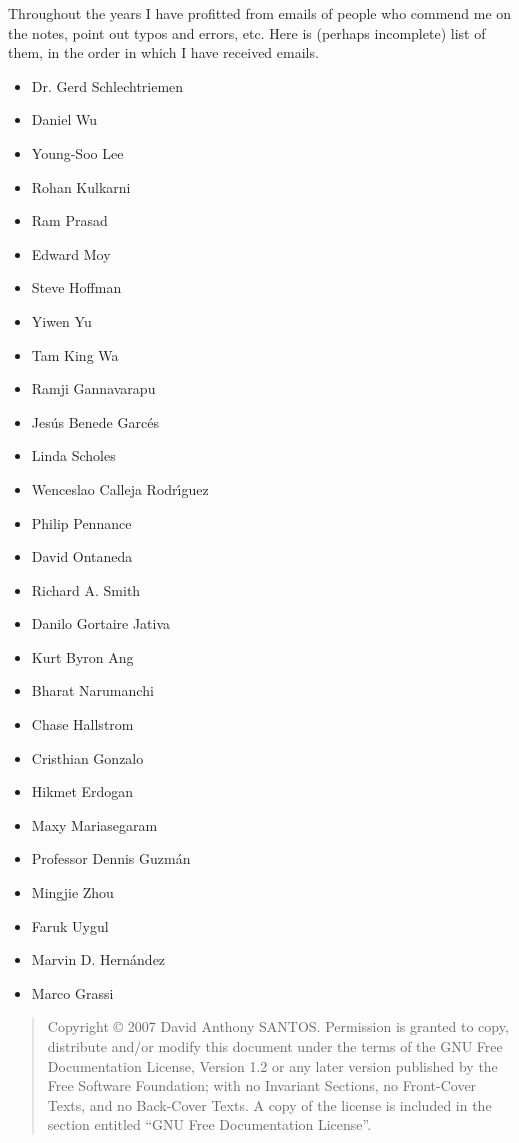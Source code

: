 \documentclass[11pt, openany]{book}
\theoremstyle{change} \theoremheaderfont{\blue\sffamily\bfseries}
\theoremstyle{nonumberplain} \theoremheaderfont{\sffamily\bfseries}
\newcommand{\í}{\'{\i}}
\begin{document}
Throughout the years I have profitted from emails of people who
commend me on the notes, point out typos and errors, etc. Here is
(perhaps incomplete) list of them, in the order in which I have
received emails.
\begin{multicols}{3}
\begin{itemize}
\item Dr. Gerd Schlechtriemen
\item Daniel Wu
\item Young-Soo Lee
\item Rohan Kulkarni
\item Ram Prasad
\item Edward Moy
\item Steve Hoffman
\item Yiwen Yu
\item Tam King Wa
\item Ramji Gannavarapu
\item Jes\'{u}s Benede Garc\'{e}s
\item Linda Scholes
\item Wenceslao Calleja Rodr\'{\i}guez
\item Philip Pennance
\item David Ontaneda
\item Richard A. Smith
\item Danilo Gortaire Jativa
\item Kurt Byron Ang
\item Bharat Narumanchi
\item Chase Hallstrom
\item Cristhian Gonzalo
\item Hikmet Erdogan
\item Maxy Mariasegaram
\item Professor Dennis Guzm\'{a}n
\item Mingjie Zhou
\item Faruk Uygul
\item Marvin D. Hern\'{a}ndez
\item Marco Grassi
\end{itemize}
\end{multicols}


\clearpage



\begin{quote}
    Copyright \copyright{}  2007  David Anthony SANTOS.
    Permission is granted to copy, distribute and/or modify this document
    under the terms of the GNU Free Documentation License, Version 1.2
    or any later version published by the Free Software Foundation;
    with no Invariant Sections, no Front-Cover Texts, and no Back-Cover Texts.
    A copy of the license is included in the section entitled ``GNU
    Free Documentation License''.
\end{quote}
\clearpage
\end{document}
